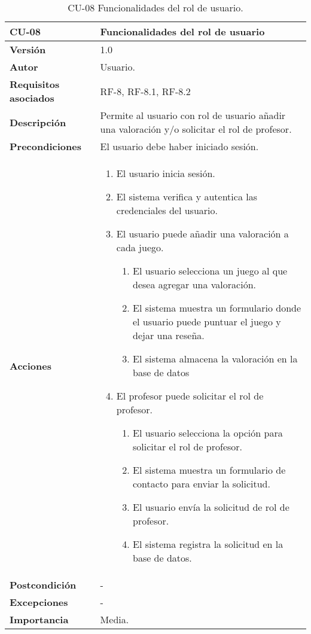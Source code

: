 \begin{table}[p]
	\centering
	\begin{tabularx}{\linewidth}{ p{} p{} }
		\toprule
		\textbf{CU-08}    & \textbf{ Funcionalidades del rol de usuario}\\
		\toprule
		\textbf{Versión}              & 1.0    \\
		\textbf{Autor}                & Usuario. \\
		\textbf{Requisitos asociados} & RF-8, RF-8.1, RF-8.2 \\
		\textbf{Descripción}          & Permite al usuario con rol de usuario añadir una valoración y/o solicitar el rol de profesor.\\
		\textbf{Precondiciones}         & El usuario debe haber iniciado sesión. \\
		\textbf{Acciones}             &
\begin{enumerate}
	\item El usuario inicia sesión.
	\item El sistema verifica y autentica las credenciales del usuario.
	\item El usuario puede añadir una valoración a cada juego.
    	\begin{enumerate}
    		\renewcommand{\labelenumii}{\arabic{enumi}.\arabic{enumii}}
            \item El usuario selecciona un juego al que desea agregar una valoración.
    		\item El sistema muestra un formulario donde el usuario puede puntuar el juego y dejar una reseña.
    		\item El sistema almacena la valoración en la base de datos
    	\end{enumerate}
    \item El profesor puede solicitar el rol de profesor.
    	\begin{enumerate}
    		\renewcommand{\labelenumii}{\arabic{enumi}.\arabic{enumii}}
    		\item El usuario selecciona la opción para solicitar el rol de profesor.
    		\item El sistema muestra un formulario de contacto para enviar la solicitud.
    		\item El usuario envía la solicitud de rol de profesor.
            \item El sistema registra la solicitud en la base de datos.
    	\end{enumerate}
\end{enumerate}\\
         \textbf{Postcondición}             & - \\
		\textbf{Excepciones}             & - \\
		\textbf{Importancia}          & Media. \\
		\bottomrule
	\end{tabularx}
	\caption{CU-08  Funcionalidades del rol de usuario.}
\end{table}

